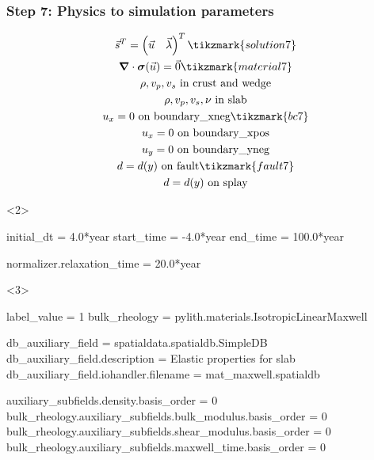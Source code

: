 \documentclass[aspectratio=169]{beamer}
\begin{document}
\begin{frame}[t,fragile]
  \frametitle{Step 7: Physics to simulation parameters}
  \summary{}

  \begin{minipage}[t]{0.3\textwidth}
    {\scriptsize
    \begin{gather*}
    \vec{s}^T = \left( \vec{u} \quad \vec{\lambda} \right)^T \tikzmark{solution7}\\
    \tensor{\nabla} \cdot \tensor{\sigma}(\vec{u}) = \vec{0} \tikzmark{material7}\\
    \rho, v_p, v_s \text{ in crust and wedge} \\
    \rho, v_p, v_s, \nu  \text{ in slab} \\
    u_x = 0 \text{ on boundary\_xneg} \tikzmark{bc7}\\
    u_x = 0 \text{ on boundary\_xpos} \\
    u_y = 0 \text{ on boundary\_yneg} \\
    d = d(y) \text{ on fault} \tikzmark{fault7} \\
    d = d(y) \text{ on splay}
    \end{gather*}}
  \end{minipage}
  \hfill
  \begin{minipage}[t]{0.67\textwidth}
    \begin{onlyenv}<2>
      \begin{cfgcode}
        initial_dt = 4.0*year
        start_time = -4.0*year
        end_time = 100.0*year

        normalizer.relaxation_time = 20.0*year
      \end{cfgcode}
    \end{onlyenv}
    \begin{onlyenv}<3>
      \begin{cfgcode}
        label_value = 1
        bulk_rheology = pylith.materials.IsotropicLinearMaxwell

        db_auxiliary_field = spatialdata.spatialdb.SimpleDB
        db_auxiliary_field.description = Elastic properties for slab
        db_auxiliary_field.iohandler.filename = mat_maxwell.spatialdb

        auxiliary_subfields.density.basis_order = 0
        bulk_rheology.auxiliary_subfields.bulk_modulus.basis_order = 0
        bulk_rheology.auxiliary_subfields.shear_modulus.basis_order = 0
        bulk_rheology.auxiliary_subfields.maxwell_time.basis_order = 0
        

\end{cfgcode}
\end{onlyenv}
\end{minipage}
\end{frame}
\end{document}
